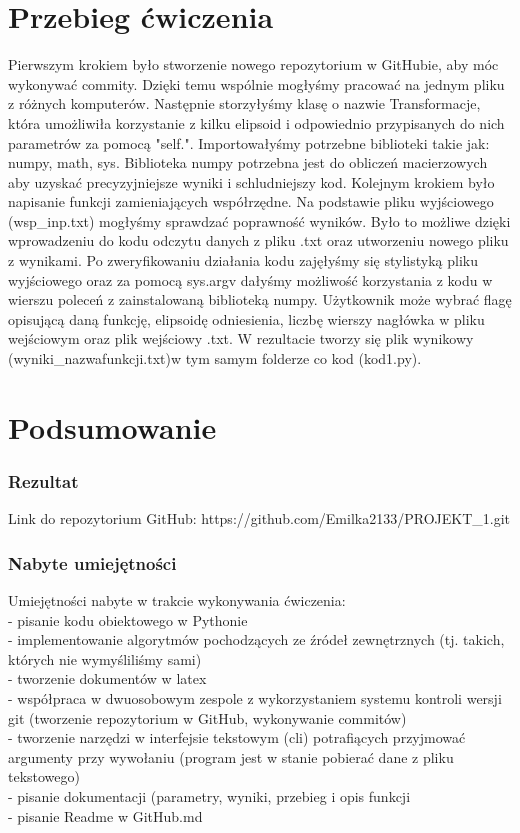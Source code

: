\documentclass[11pt,a4paper]{article}
\begin{document}
\section {Przebieg ćwiczenia}
Pierwszym krokiem było stworzenie nowego repozytorium w GitHubie, aby móc wykonywać commity. Dzięki temu wspólnie mogłyśmy pracować na jednym pliku z różnych komputerów. Następnie storzyłyśmy klasę o nazwie Transformacje, która umożliwiła korzystanie z kilku elipsoid i odpowiednio przypisanych do nich parametrów za pomocą "self.". Importowałyśmy potrzebne biblioteki takie jak: numpy, math, sys. Biblioteka numpy  potrzebna jest do obliczeń macierzowych aby uzyskać precyzyjniejsze wyniki i schludniejszy kod. Kolejnym krokiem było napisanie funkcji zamieniających współrzędne. Na podstawie pliku wyjściowego (wsp\_inp.txt) mogłyśmy sprawdzać poprawność wyników. Było to możliwe dzięki wprowadzeniu do kodu odczytu danych z pliku .txt oraz utworzeniu nowego pliku z wynikami. Po zweryfikowaniu działania kodu zajęłyśmy się stylistyką pliku wyjściowego oraz za pomocą sys.argv dałyśmy możliwość korzystania z kodu w wierszu poleceń z zainstalowaną biblioteką numpy. Użytkownik może wybrać flagę opisującą daną funkcję, elipsoidę odniesienia, liczbę wierszy nagłówka w pliku wejściowym oraz plik wejściowy .txt. W rezultacie tworzy się plik wynikowy (wyniki\_nazwafunkcji.txt)w tym samym folderze co kod (kod1.py). 

\section {Podsumowanie}

\subsubsection{Rezultat}
Link do repozytorium GitHub: https://github.com/Emilka2133/PROJEKT\_1.git
\subsubsection{Nabyte umiejętności}
Umiejętności nabyte w trakcie wykonywania ćwiczenia:\\
 - pisanie kodu obiektowego w Pythonie\\
- implementowanie algorytmów pochodzących ze źródeł zewnętrznych (tj. takich, których nie wymyśliliśmy sami)\\
- tworzenie dokumentów w latex\\
- współpraca w dwuosobowym zespole z wykorzystaniem systemu kontroli wersji git (tworzenie repozytorium w GitHub, wykonywanie commitów)\\
- tworzenie narzędzi w interfejsie tekstowym (cli) potrafiących przyjmować argumenty przy wywołaniu (program jest w stanie pobierać dane z pliku tekstowego)\\
- pisanie dokumentacji (parametry, wyniki, przebieg i opis funkcji\\
- pisanie Readme w GitHub.md\\
\end{document}
